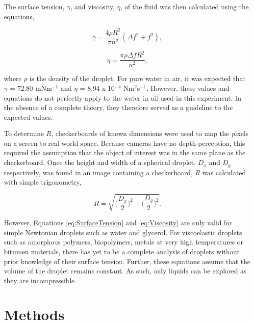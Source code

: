 \documentclass{physics_article_B}
\begin{document}
    The surface tension, $\gamma$, and viscosity, $\eta$, of the fluid was then calculated using the equations,
 
        \begin{equation} 
        \label{eq:SurfaceTension}
            \gamma = \frac{4\rho R^{2}}{\pi n^{2}}(\Delta f^{2} + f^{2}),
        \end{equation}
        
        \begin{equation} 
        \label{eq:Viscosity}
            \eta = \frac{\pi \rho \Delta f R^{2}}{n^{2}},
        \end{equation}

    where $\rho$ is the density of the droplet. For pure water in air, it was expected that\cite{expected1} $\gamma$ = 72.80 mNm$^{-1}$ and\cite{expected2} $\eta$ = 8.94 x 10$^{-4}$ Nm$^{2}$s$^{-1}$. However, these values and equations do not perfectly apply to the water in oil used in this experiment. In the absence of a complete theory, they therefore served as a guideline to the expected values. 
    
    To determine $R$, checkerboards of known dimensions were used to map the pixels on a screen to real world space. Because cameras have no depth-perception, this required the assumption that the object of interest was in the same plane as the checkerboard. Once the height and width of a spherical droplet, $D_x$ and $D_y$ respectively, was found in an image containing a checkerboard, $R$ was calculated with simple trigonometry,
            
        \begin{equation}\label{eq:radii}
            R = \sqrt{\Big(\frac{D_x}{2}\Big)^2 + \Big(\frac{D_y}{2}\Big)^2} .
        \end{equation}

    However, Equations \ref{eq:SurfaceTension} and \ref{eq:Viscosity} are only valid for simple Newtonian droplets such as water and glycerol. For viscoelastic droplets such as amorphous polymers, biopolymers, metals at very high temperatures or bitumen materials, there has yet to be a complete analysis of droplets without prior knowledge of their surface tension. Further, these equations assume that the volume of the droplet remains constant. As such, only liquids can be explored as they are incompressible.
\section{Methods\label{sect:method}}
\end{document}
